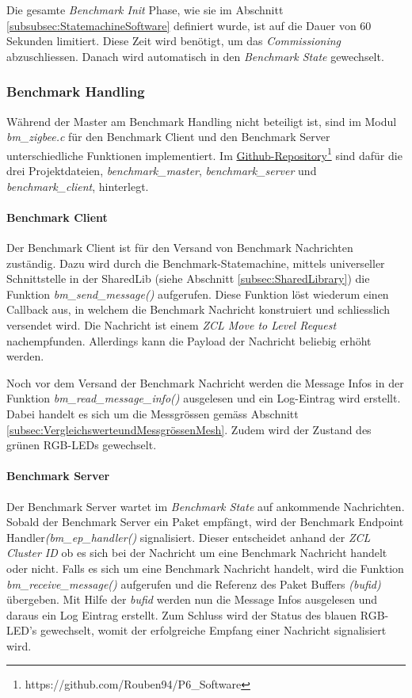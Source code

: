 Die gesamte \textit{Benchmark Init} Phase, wie sie im Abschnitt \ref{subsubsec:StatemachineSoftware} definiert wurde, ist auf die Dauer von 60 Sekunden limitiert.
Diese Zeit wird benötigt, um das \textit{Commissioning} abzuschliessen.
Danach wird automatisch in den \textit{Benchmark State} gewechselt.

\subsubsection{Benchmark Handling}\label{subsubsec:ZigbeeBenchmarkHandling}
Während der Master am Benchmark Handling nicht beteiligt ist,  sind im Modul \textit{bm\_zigbee.c} für den Benchmark Client und den Benchmark Server unterschiedliche Funktionen implementiert.
Im \href{https://github.com/Rouben94/P6_Software}{Github-Repository\footnote{\url{https://github.com/Rouben94/P6_Software}\cite{anklin_bobst_horath_rouben94p6_software_nodate}}} sind dafür die drei Projektdateien, \textit{benchmark\_master}, \textit{benchmark\_server} und \textit{benchmark\_client}, hinterlegt.

\paragraph{Benchmark Client}
Der Benchmark Client ist für den Versand von Benchmark Nachrichten zuständig.
Dazu wird durch die Benchmark-Statemachine, mittels universeller Schnittstelle in der SharedLib (siehe Abschnitt \ref{subsec:SharedLibrary}) die Funktion \textit{bm\_send\_message()} aufgerufen.
Diese Funktion löst wiederum einen Callback aus, in welchem die Benchmark Nachricht konstruiert und schliesslich versendet wird.
Die Nachricht ist einem \textit{ZCL Move to Level Request} nachempfunden.
Allerdings kann die Payload der Nachricht beliebig erhöht werden.

Noch vor dem Versand der Benchmark Nachricht werden die Message Infos in der Funktion \textit{bm\_read\_message\_info()} ausgelesen und ein Log-Eintrag wird erstellt.
Dabei handelt es sich um die Messgrössen gemäss Abschnitt \ref{subsec:VergleichswerteundMessgrössenMesh}.
Zudem wird der Zustand des grünen RGB-LEDs gewechselt.

\paragraph{Benchmark Server}
Der Benchmark Server wartet im \textit{Benchmark State} auf ankommende Nachrichten.
Sobald der Benchmark Server ein Paket empfängt, wird der Benchmark Endpoint Handler\linebreak \textit{(bm\_ep\_handler()} signalisiert.
Dieser entscheidet anhand der \textit{ZCL Cluster ID} ob es sich bei der Nachricht um eine Benchmark Nachricht handelt oder nicht.
Falls es sich um eine Benchmark Nachricht handelt, wird die Funktion \textit{bm\_receive\_message()} aufgerufen und die Referenz des Paket Buffers \textit{(bufid)} übergeben.
Mit Hilfe der \textit{bufid} werden nun die Message Infos ausgelesen und daraus ein Log Eintrag erstellt.
Zum Schluss wird der Status des blauen RGB-LED's gewechselt, womit der erfolgreiche Empfang einer Nachricht signalisiert wird.

